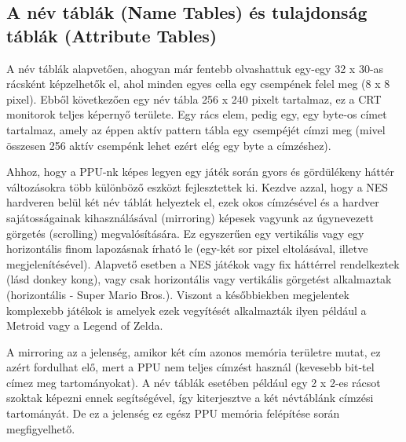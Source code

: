 	\subsection{A név táblák (Name Tables) és tulajdonság táblák (Attribute Tables)}
	
	A név táblák alapvetően, ahogyan már fentebb olvashattuk egy-egy 32 x 30-as rácsként képzelhetők el, ahol minden egyes cella egy csempének felel meg (8 x 8 pixel). Ebből következően egy név tábla 256 x 240 pixelt tartalmaz, ez a CRT monitorok teljes képernyő területe. Egy rács elem, pedig egy, egy byte-os címet tartalmaz, amely az éppen aktív pattern tábla egy csempéjét címzi meg (mivel összesen 256 aktív csempénk lehet ezért elég egy byte a címzéshez).
	
	Ahhoz, hogy a PPU-nk képes legyen egy játék során gyors és gördülékeny háttér változásokra több különböző eszközt fejlesztettek ki. Kezdve azzal, hogy a NES hardveren belül két név táblát helyeztek el, ezek okos címzésével és a hardver sajátosságainak kihasználásával (mirroring) képesek vagyunk az úgynevezett görgetés (scrolling) megvalósítására. Ez egyszerűen egy vertikális vagy egy horizontális finom lapozásnak írható le (egy-két sor pixel eltolásával, illetve megjelenítésével). Alapvető esetben a NES játékok vagy fix háttérrel rendelkeztek (lásd donkey kong), vagy csak horizontális vagy vertikális görgetést alkalmaztak (horizontális - Super Mario Bros.). Viszont a későbbiekben megjelentek komplexebb játékok is amelyek ezek vegyítését alkalmazták ilyen például a Metroid vagy a Legend of Zelda.
	
	A mirroring az a jelenség, amikor két cím azonos memória területre mutat, ez azért fordulhat elő, mert a PPU nem teljes címzést használ (kevesebb bit-tel címez meg tartományokat). A név táblák esetében például egy 2 x 2-es rácsot szoktak képezni ennek segítségével, így kiterjesztve a két névtáblánk címzési tartományát. De ez a jelenség ez egész PPU memória felépítése során megfigyelhető.
	
